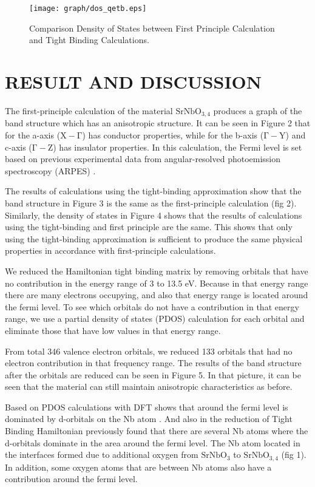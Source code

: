 \documentclass{aip-cp}
\begin{document}
\begin{figure}[t]
  \centerline{\texttt{[image: graph/dos\_qetb.eps]}}
  \caption{Comparison Density of States between First Principle Calculation and Tight Binding Calculations.}
\end{figure}

\section{RESULT AND DISCUSSION}
The first-principle calculation of the material $ \mathrm{SrNbO_{3,4}} $ produces a graph of the band structure which has an anisotropic structure. It can be seen in Figure 2 that for the a-axis ($ \mathrm{X - \Gamma} $) has conductor properties, while for the b-axis ($ \mathrm{\Gamma - Y} $) and c-axis ($ \mathrm{\Gamma-Z} $) has insulator properties. In this calculation, the Fermi level is set based on previous experimental data from angular-resolved photoemission spectroscopy (ARPES) \cite{kuntscher}.

The results of calculations using the tight-binding approximation show that the band structure in Figure 3 is the same as the first-principle calculation (fig 2). Similarly, the density of states in Figure 4 shows that the results of calculations using the tight-binding and first principle are the same. This shows that only using the tight-binding approximation is sufficient to produce the same physical properties in accordance with first-principle calculations.

We reduced the Hamiltonian tight binding matrix by removing orbitals that have no contribution in the energy range of 3 to 13.5 eV. Because in that energy range there are many electrons occupying, and also that energy range is located around the fermi level. To see which orbitals do not have a contribution in that energy range, we use a partial density of states (PDOS) calculation for each orbital and eliminate those that have low values ​​in that energy range.

From total 346 valence electron orbitals, we reduced 133 orbitals that had no electron contribution in that frequency range. The results of the band structure after the orbitals are reduced can be seen in Figure 5. In that picture, it can be seen that the material can still maintain anisotropic characteristics as before.

Based on PDOS calculations with DFT shows that around the fermi level is dominated by d-orbitals on the Nb atom \cite{Wan2017}. And also in the reduction of Tight Binding Hamiltonian previously found that there are several Nb atoms where the d-orbitals dominate in the area around the fermi level. The Nb atom located in the interfaces formed due to additional oxygen from $ \mathrm{SrNbO_{3}} $ to $ \mathrm{SrNbO_{3,4}} $ (fig 1). In addition, some oxygen atoms that are between Nb atoms also have a contribution around the fermi level.
\end{document}
